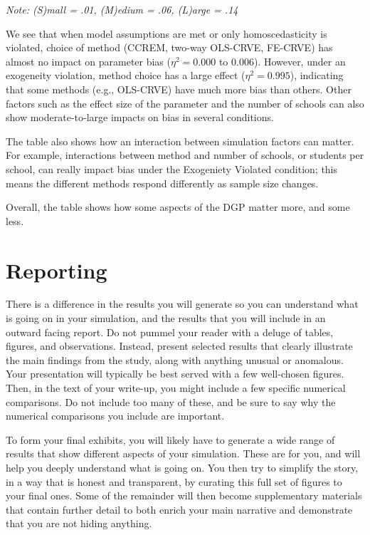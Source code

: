 \documentclass[
]{book}
\begin{document}
\emph{Note: (S)mall = .01, (M)edium = .06, (L)arge = .14}

We see that when model assumptions are met or only homoscedasticity is violated, choice of method (CCREM, two-way OLS-CRVE, FE-CRVE) has almost no impact on parameter bias (\(\eta^2 = 0.000\) to 0.006).
However, under an exogeneity violation, method choice has a large effect (\(\eta^2 = 0.995\)), indicating that some methods (e.g., OLS-CRVE) have much more bias than others.
Other factors such as the effect size of the parameter and the number of schools can also show moderate-to-large impacts on bias in several conditions.

The table also shows how an interaction between simulation factors can matter.
For example, interactions between method and number of schools, or students per school, can really impact bias under the Exogeniety Violated condition; this means the different methods respond differently as sample size changes.

Overall, the table shows how some aspects of the DGP matter more, and some less.

\section{Reporting}\label{reporting}

There is a difference in the results you will generate so you can understand what is going on in your simulation, and the results that you will include in an outward facing report.
Do not pummel your reader with a deluge of tables, figures, and observations.
Instead, present selected results that clearly illustrate the main findings from the study, along with anything unusual or anomalous.
Your presentation will typically be best served with a few well-chosen figures.
Then, in the text of your write-up, you might include a few specific numerical comparisons.
Do not include too many of these, and be sure to say why the numerical comparisons you include are important.

To form your final exhibits, you will likely have to generate a wide range of results that show different aspects of your simulation.
These are for you, and will help you deeply understand what is going on.
You then try to simplify the story, in a way that is honest and transparent, by curating this full set of figures to your final ones.
Some of the remainder will then become supplementary materials that contain further detail to both enrich your main narrative and demonstrate that you are not hiding anything.
\end{document}
